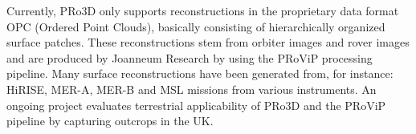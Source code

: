 Currently, PRo3D only supports reconstructions in the proprietary data format OPC (Ordered Point Clouds), basically consisting of hierarchically organized surface patches. These reconstructions stem from orbiter images and rover images and are produced by Joanneum Research by using the PRoViP processing pipeline. Many surface reconstructions have been generated from, for instance: HiRISE, MER-A, MER-B and MSL missions from various instruments. An ongoing project evaluates terrestrial applicability of PRo3D and the PRoViP pipeline by capturing outcrops in the UK. 

